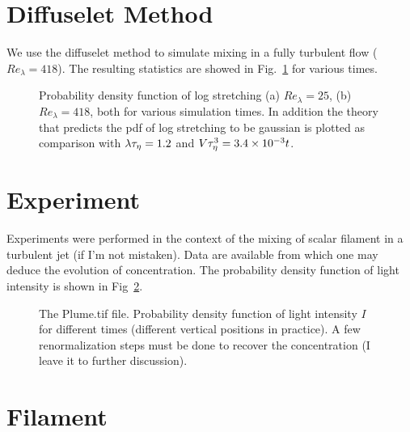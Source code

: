 \section{Diffuselet Method}

We use the diffuselet method to simulate mixing in a fully turbulent flow ($\mathit{Re}_{\lambda} = 418$).
The resulting statistics are showed in Fig.~\ref{fig:diffuselet_theory_check} for various times.
\begin{figure}
    \centering
    
    \caption{
    	Probability density function of log stretching
    	(a) $\mathit{Re_{\lambda}} = 25$,
    	(b) $\mathit{Re_{\lambda}} = 418$,
    	both for various simulation times.
    	In addition the theory that predicts the pdf of log stretching to be gaussian is plotted as comparison with $\lambda \tau_{\eta} = 1.2$ and $V \tau_{\eta}^3 = 3.4 \times 10^{-3} t$.
    }
    \label{fig:diffuselet_theory_check}
\end{figure}

\section{Experiment}

Experiments were performed in the context of the mixing of scalar filament in a turbulent jet (if I'm not mistaken).
Data are available from which one may deduce the evolution of concentration.
The probability density function of light intensity is shown in Fig~\ref{fig:exp_intensity}.
\begin{figure}
    \centering
    
    \caption{
		The Plume.tif file. Probability density function of light intensity $I$ for different times (different vertical positions in practice).
		A few renormalization steps must be done to recover the concentration (I leave it to further discussion).
    }
    \label{fig:exp_intensity}
\end{figure}

\section{Filament}

